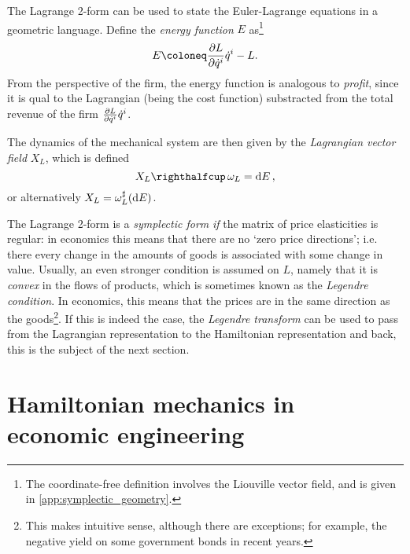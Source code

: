 The Lagrange 2-form can be used to state the Euler-Lagrange equations in a geometric language. Define the \emph{energy function} \(E\) as\footnote{The coordinate-free definition involves the Liouville vector field, and is given in \cref{app:symplectic_geometry}.}
\begin{equation}
    E \coloneq \pdv{L}{\dot{q}^i}\dot{q}^i - L.
\end{equation}
From the perspective of the firm, the energy function is analogous to \emph{profit}, since it is qual to the Lagrangian (being the cost function) substracted from the total revenue of the firm \(\pdv{L}{\dot{q}^i}\dot{q}^i\).
    
The dynamics of the mechanical system are then given by the \emph{Lagrangian vector field} \(X_L\), which is defined 
\begin{equation}
    \intpr{X_L}{\omega_L} = \dd{E}, 
\end{equation}
or alternatively \(X_L = \omega_L^\sharp(\dd{E})\).

The Lagrange 2-form is a \emph{symplectic form} \emph{if} the matrix of price elasticities is regular: in economics this means that there are no `zero price directions'; i.e. there every change in the amounts of goods is associated with some change in value. Usually, an even stronger condition is assumed on \(L\), namely that it is \emph{convex} in the flows of products, which is sometimes known as the \emph{Legendre condition}. In economics, this means that the prices are in the same direction as the goods\footnote{This makes intuitive sense, although there are exceptions; for example, the negative yield on some government bonds in recent years.}. If this is indeed the case, the \emph{Legendre transform} can be used to pass from the Lagrangian representation to the Hamiltonian representation and back, this is the subject of the next section. 

\section{Hamiltonian mechanics in economic engineering}
